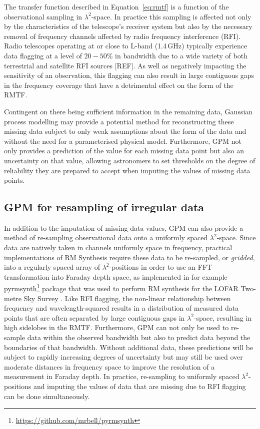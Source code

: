 \documentclass[fleqn,usenatbib]{mnras}
\begin{document}
The transfer function described in Equation~\ref{eq:rmtf} is a function of the observational sampling in $\lambda^2$-space. In practice this sampling is affected not only by the characteristics of the telescope's receiver system but also by the necessary removal of frequency channels affected by radio frequency interference (RFI). Radio telescopes operating at or close to L-band (1.4\,GHz) typically experience data flagging at a level of $20-50\%$ in bandwidth due to a wide variety of both terrestrial and satellite RFI sources [REF]. As well as negatively impacting the sensitivity of an observation, this flagging can also result in large contiguous gaps in the frequency coverage that have a detrimental effect on the form of the RMTF.

Contingent on there being sufficient information in the remaining data, Gaussian process modelling may provide a potential method for reconstructing these missing data subject to only weak assumptions about the form of the data and without the need for a parameterised physical model. Furthermore, GPM not only provides a prediction of the value for each missing data point but also an uncertainty on that value, allowing astronomers to set thresholds on the degree of reliability they are prepared to accept when imputing the values of missing data points.

\subsection{GPM for resampling of irregular data}
\label{sec:resampling}

In addition to the imputation of missing data values, GPM can also provide a method of re-sampling observational data onto a uniformly spaced $\lambda^2$-space. Since data are natively taken in channels uniformly space in frequency, practical implementations of RM Synthesis require these data to be re-sampled, or {\it gridded}, into a regularly spaced array of $\lambda^2$-positions in order to use an FFT transformation into Faraday depth space, as implemented in for example {\sc pyrmsynth}\footnote{\url{https://github.com/mrbell/pyrmsynth}} package that was used to perform RM synthesis for the LOFAR Two-metre Sky Survey \citep{lofarpyrmsynth}. Like RFI flagging, the non-linear relationship between frequency and wavelength-squared results in a distribution of measured data points that are often separated by large contiguous gaps in $\lambda^2$-space, resulting in high sidelobes in the RMTF. Furthermore, GPM can not only be used to re-sample data within the observed bandwidth but also to predict data beyond the boundaries of that bandwidth. Without additional data, these predictions will be subject to rapidly increasing degrees of uncertainty but may still be used over moderate distances in frequency space to improve the resolution of a measurement in Faraday depth. In practice, re-sampling to uniformly spaced $\lambda^2$-positions and imputing the values of data that are missing due to RFI flagging can be done simultaneously.
\end{document}
